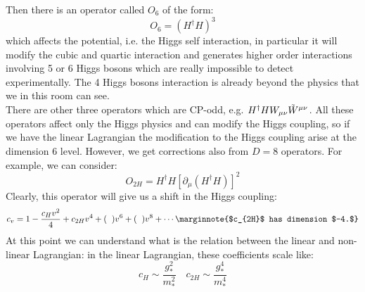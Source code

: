 \documentclass[../main.tex]{subfiles}
\begin{document}
Then there is an operator called $O_6$ of the form:
\[
O_6=(H^\dagger H)^3
\]
which affects the potential, i.e. the Higgs self interaction, in particular it will modify the cubic and quartic interaction and generates higher order interactions involving 5 or 6 Higgs bosons which are really impossible to detect experimentally. The 4 Higgs bosons interaction is already beyond the physics that we in this room can see.\\
There are other three operators which are CP-odd, e.g. $H^\dagger HW_{\mu\nu}\Tilde{W}^{\mu\nu}$. All these operators affect only the Higgs physics and can modify the Higgs coupling, so if we have the linear Lagrangian the modification to the Higgs coupling arise at the dimension 6 level. However, we get corrections also from $D=8$ operators. For example, we can consider:
\[
O_{2H}=H^\dagger H[\partial_\mu(H^\dagger H)]^2
\]
Clearly, this operator will give us a shift in the Higgs coupling:
\[
c_v=1-\frac{c_Hv^2}{4}+c_{2H}v^4+(\;\;)v^6+(\;\;)v^8+\cdots\marginnote{$c_{2H}$ has dimension $-4.$} 
\]
At this point we can understand what is the relation between the linear and non-linear Lagrangian: in the linear Lagrangian, these coefficients scale like:
\[
c_H\sim\frac{g_*^2}{m_*^2} \quad c_{2H}\sim\frac{g_*^4}{m_*^4}
\]
\end{document}
